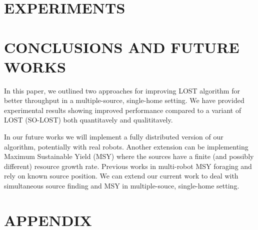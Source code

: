 \documentclass[letterpaper, 10 pt, conference]{ieeeconf}  %
\begin{document}
\section{EXPERIMENTS} \label{section:experiments}

\section{CONCLUSIONS AND FUTURE WORKS}

In this paper, we outlined two approaches for improving LOST algorithm for better throughput in a multiple-source, single-home setting. We have provided experimental results showing improved performance compared to a variant of LOST (SO-LOST) both quantitavely and qualititavely.  

In our future works we will implement a fully distributed version of our algorithm, potentially with real robots. Another extension can be implementing Maximum Sustainable Yield (MSY) \cite{MSY_PAPER Hjort et al. 1933 } where the sources have a finite (and possibly different) resource growth rate. Previous works in multi-robot MSY foraging \cite{Song and Vaughan 2013} and \cite{Zhang
and Zhao Song 2016} rely on known source position. We can extend our current work to deal with simultaneous source finding and MSY in multiple-souce, single-home setting. 

\addtolength{\textheight}{-12cm}   %







\section*{APPENDIX}
\end{document}
